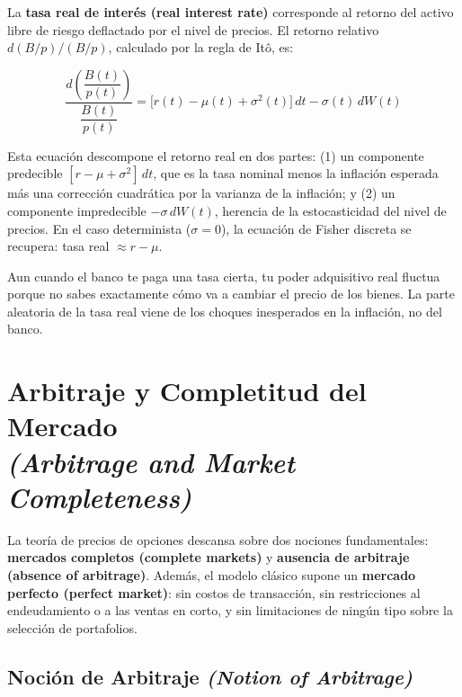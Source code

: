 \documentclass[12pt]{article}
\begin{document}
La \textbf{tasa real de inter\'es (real interest rate)} corresponde al retorno del activo libre de riesgo deflactado por el nivel de precios. El retorno relativo $d(B/p)/(B/p)$, calculado por la regla de It\^o, es:

\begin{equation}
  \frac{d\!\left(\dfrac{B(t)}{p(t)}\right)}{\dfrac{B(t)}{p(t)}} = \bigl[r(t) - \mu(t) + \sigma^2(t)\bigr]\,dt - \sigma(t)\,dW(t)
\end{equation}

\begin{intuicionmat}
Esta ecuaci\'on descompone el retorno real en dos partes: (1) un componente predecible $[r - \mu + \sigma^2]\,dt$, que es la tasa nominal menos la inflaci\'on esperada m\'as una correcci\'on cuadr\'atica por la varianza de la inflaci\'on; y (2) un componente impredecible $-\sigma\,dW(t)$, herencia de la estocasticidad del nivel de precios. En el caso determinista ($\sigma=0$), la ecuaci\'on de Fisher discreta se recupera: tasa real $\approx r - \mu$.
\end{intuicionmat}

\begin{intuicion}
Aun cuando el banco te paga una tasa cierta, tu poder adquisitivo real fluctua porque no sabes exactamente c\'omo va a cambiar el precio de los bienes. La parte aleatoria de la tasa real viene de los choques inesperados en la inflaci\'on, no del banco.
\end{intuicion}

\section{Arbitraje y Completitud del Mercado\\
\textit{(Arbitrage and Market Completeness)}}

La teor\'ia de precios de opciones descansa sobre dos nociones fundamentales: \textbf{mercados completos (complete markets)} y \textbf{ausencia de arbitraje (absence of arbitrage)}. Adem\'as, el modelo cl\'asico supone un \textbf{mercado perfecto (perfect market)}: sin costos de transacci\'on, sin restricciones al endeudamiento o a las ventas en corto, y sin limitaciones de ning\'un tipo sobre la selecci\'on de portafolios.

\subsection{Noci\'on de Arbitraje \textit{(Notion of Arbitrage)}}
\end{document}
